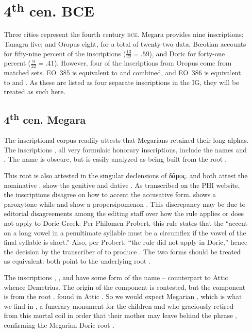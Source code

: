\section{4\textsuperscript{th} cen.  BCE}

Three cities represent the fourth century \textsc{bce}.
Megara provides nine inscriptions;
Tanagra five;
and Oropus eight,
for a total of twenty-two data.
Bœotian accounts for fifty-nine percent of the inscriptions ($\frac{13}{22}=.59$),
and Doric for forty-one percent ($\frac{9}{22}=.41$).
However,
four of the inscriptions from Oropus come from matched sets.
EO~385 is equivalent to  and  combined,
and EO~386 is equivalent to  and .
As these are listed as four separate inscriptions in the IG,
they will be treated as such here.


\subsection{4\textsuperscript{th} cen.  Megara}
The inscriptional corpus readily attests that Megarians retained their long alphas.
The inscriptions ,
all very formulaic honorary inscriptions, include the names 
and .
The name  is obscure,
but  is easily analyzed as being built from the root .

This root is also attested in the singular declensions of δᾶμος. 
 and  both attest the nominative ,
 show the genitive  and dative .
As transcribed on the PHI website,
the inscriptions disagree on how to accent the accusative form.
 shows a paroxytone 
while  and  show a propersipomenon .
This discrepancy may be due to editorial disagreements among the editing staff
over how the  rule applies or does not apply to Doric Greek. 
Per Philomen Probert, 
this rule states that the ``accent on a long vowel in a penultimate syllable must be a circumflex
if the vowel of the final syllable is short.''\autocite[61]{Probert}
Also, per Probert, 
``the  rule did not apply in Doric,''\autocite[71]{Probert}
hence the decision by the transcriber of  to produce .
The two forms should be treated as equivalent: both point to the underlying root .

The inscriptions ,
,
and  have some form of the name  -- 
counterpart to Attic  whence Demetrius.
The origin of the component  is contested,
but the component  is from the root ,
found in Attic .
So we would expect Megarian ,
which is what we find in ,
a funerary monument for the children  and 
who graciously retired from this mortal coil
in order that their mother may leave behind the phrase ,
confirming the Megarian Doric root .

